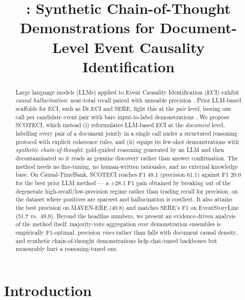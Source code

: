 \documentclass[11pt]{article}
\title{\method{}: Synthetic Chain-of-Thought Demonstrations for Document-Level Event Causality Identification}
\author{}
\date{}
\newcommand{\method}{SCOTECI}
\begin{document}
\maketitle

\begin{abstract}
Large language models (LLMs) applied to Event Causality Identification (ECI) exhibit
\emph{causal hallucination}: near-total recall paired with unusable precision
\citep{gao2023chatgpt}. Prior LLM-based scaffolds for ECI, such as Dr.ECI and SERE,
fight this at the \emph{pair} level, issuing one call per candidate event pair with
bare input-to-label demonstrations \citep{cai2025dreci, hao2026sere}. We propose
\method{}, which instead (i) reformulates LLM-based ECI at the \emph{document} level,
labelling every pair of a document jointly in a single call under a structured
reasoning protocol with explicit coherence rules, and (ii) equips its few-shot
demonstrations with \emph{synthetic chain-of-thought}: gold-guided reasoning generated
by an LLM and then decontaminated so it reads as genuine discovery rather than answer
confirmation. The method needs no fine-tuning, no human-written rationales, and no
external knowledge base. On Causal-TimeBank, \method{} reaches F1 48.1 (precision
61.1) against F1 20.0 for the best prior LLM method --- a +28.1 F1 gain obtained by
breaking out of the degenerate high-recall/low-precision regime rather than trading
recall for precision, on the dataset where positives are sparsest and hallucination is
costliest. It also attains the best precision on MAVEN-ERE (40.8) and matches SERE's
F1 on EventStoryLine (51.7 vs.\ 49.9). Beyond the headline numbers, we present an
evidence-driven analysis of the method itself: majority-vote aggregation over
demonstration ensembles is empirically F1-optimal, precision \emph{rises} rather than
falls with document causal density, and synthetic chain-of-thought demonstrations help
chat-tuned backbones but measurably hurt a reasoning-tuned one.
\end{abstract}

\section{Introduction}
\label{sec:intro}
\end{document}
